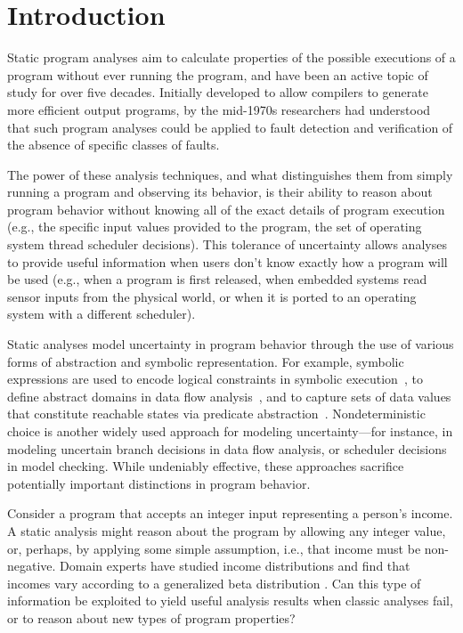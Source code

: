 \section{Introduction}
\label{sec:introduction}

Static program analyses aim to calculate properties of 
the possible executions of a program without ever running the program,
and have been an active topic of study for over five decades.
Initially developed to allow compilers to generate more efficient
output programs, by the mid-1970s \cite{fosdick1976data} researchers had
understood that such program analyses could be applied to fault
detection and verification of the absence of specific classes of faults.

The power of these analysis techniques, and what distinguishes them from
simply running a program and observing its behavior, is their
ability to reason about program behavior without knowing all of the
exact details of program execution (e.g., the specific 
input values provided to the program, the set of operating system
thread scheduler decisions).  This tolerance of uncertainty allows analyses
to provide useful information when users don't know exactly how
a program will be used (e.g., when a program is first released, when
embedded systems read sensor inputs from the physical world, or
when it is ported to an operating system with a different scheduler).

Static analyses model uncertainty in program behavior
through the use of various forms of abstraction and symbolic representation.
For example, symbolic expressions are used to encode logical constraints 
in symbolic execution~\cite{king1976symbolic}, to define abstract domains
in data flow analysis~\cite{kildall1973unified,cousot1977abstract}, and to 
capture sets of data values that constitute reachable states via
predicate abstraction~\cite{graf1997predabs}.
Nondeterministic choice is another widely used approach for modeling
uncertainty---for instance, in modeling uncertain branch 
decisions in data flow analysis,
or scheduler decisions in model checking.
While undeniably effective, these approaches sacrifice potentially
important distinctions in program behavior.   

Consider a program that accepts an integer input representing
a person's income.  A static analysis might reason about the program
by allowing any integer value, or, perhaps, by applying
some simple assumption, i.e., that income must be non-negative.
Domain experts have studied income distributions and find that
incomes vary according to a generalized beta distribution 
\cite{mcdonald1984some,thurow1970analyzing}.  Can this type of information be 
exploited to yield useful analysis results when classic
analyses fail, or to reason about new types of program properties?


